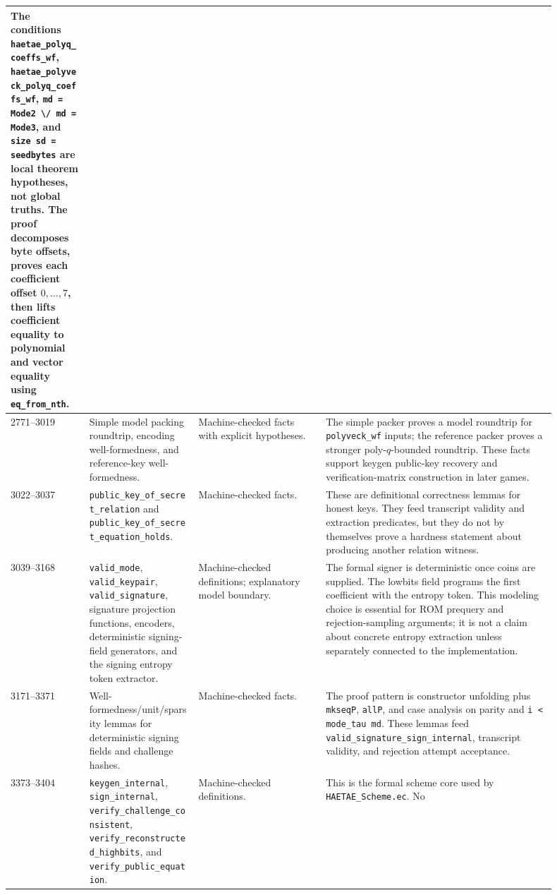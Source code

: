 \documentclass[11pt]{report}
\DeclareRobustCommand{\file}[1]{\ifmmode\text{\nolinkurl{#1}}\else\nolinkurl{#1}\fi}
\DeclareRobustCommand{\ec}[1]{\ifmmode\text{\nolinkurl{#1}}\else\nolinkurl{#1}\fi}
\theoremstyle{definition}
\theoremstyle{plain}
\begin{document}
\begin{longtable}{p{0.13\linewidth}p{0.18\linewidth}p{0.21\linewidth}p{0.38\linewidth}}
The conditions \ec{haetae\_polyq\_coeffs\_wf},
\ec{haetae\_polyveck\_polyq\_coeffs\_wf}, \ec{md = Mode2 \/ md = Mode3},
and \ec{size sd = seedbytes} are local theorem hypotheses, not global truths.
The proof decomposes byte offsets, proves each coefficient offset \(0,\ldots,7\),
then lifts coefficient equality to polynomial and vector equality using
\ec{eq\_from\_nth}. \\
\midrule
2771--3019 &
Simple model packing roundtrip, encoding well-formedness, and reference-key
well-formedness. &
Machine-checked facts with explicit hypotheses. &
The simple packer proves a model roundtrip for \ec{polyveck\_wf} inputs; the
reference packer proves a stronger poly-\(q\)-bounded roundtrip.  These facts
support keygen public-key recovery and verification-matrix construction in
later games. \\
\midrule
3022--3037 &
\ec{public\_key\_of\_secret\_relation} and
\ec{public\_key\_of\_secret\_equation\_holds}. &
Machine-checked facts. &
These are definitional correctness lemmas for honest keys.  They feed
transcript validity and extraction predicates, but they do not by themselves
prove a hardness statement about producing another relation witness. \\
\midrule
3039--3168 &
\ec{valid\_mode}, \ec{valid\_keypair}, \ec{valid\_signature}, signature
projection functions, encoders, deterministic signing-field generators, and
the signing entropy token extractor. &
Machine-checked definitions; explanatory model boundary. &
The formal signer is deterministic once coins are supplied.  The lowbits field
programs the first coefficient with the entropy token.  This modeling choice
is essential for ROM prequery and rejection-sampling arguments; it is not a
claim about concrete entropy extraction unless separately connected to the
implementation. \\
\midrule
3171--3371 &
Well-formedness/unit/sparsity lemmas for deterministic signing fields and
challenge hashes. &
Machine-checked facts. &
The proof pattern is constructor unfolding plus \ec{mkseqP}, \ec{allP}, and
case analysis on parity and \ec{i < mode\_tau md}.  These lemmas feed
\ec{valid\_signature\_sign\_internal}, transcript validity, and rejection
attempt acceptance. \\
\midrule
3373--3404 &
\ec{keygen\_internal}, \ec{sign\_internal},
\ec{verify\_challenge\_consistent}, \ec{verify\_reconstructed\_highbits},
and \ec{verify\_public\_equation}. &
Machine-checked definitions. &
This is the formal scheme core used by \file{HAETAE\_Scheme.ec}.  No

\end{longtable}
\end{document}
